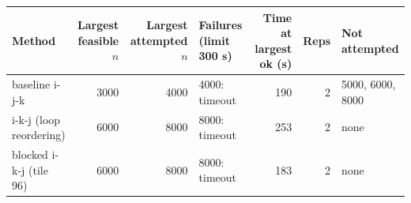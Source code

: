 \begin{tabular}{lrrlrrl}
\toprule
Method & Largest feasible $n$ & Largest attempted $n$ & Failures (limit 300 s) & Time at largest ok (s) & Reps & Not attempted \\
\midrule
baseline i-j-k & 3000 & 4000 & 4000: timeout & 190 & 2 & 5000, 6000, 8000 \\
i-k-j (loop reordering) & 6000 & 8000 & 8000: timeout & 253 & 2 & none \\
blocked i-k-j (tile 96) & 6000 & 8000 & 8000: timeout & 183 & 2 & none \\
\bottomrule
\end{tabular}
